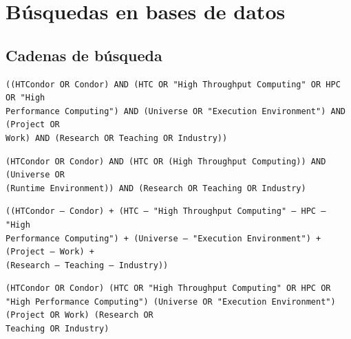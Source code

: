 \appendix


\chapter{Búsquedas en bases de datos}

\section{Cadenas de búsqueda}\label{sec:cadenas-busqueda}


\begin{tcolorbox}[
		colback=gray!5,
		colframe=black!60,
		title=Cadena de búsqueda en ACM Full Text Collection,
		fonttitle=\bfseries,
		sharp corners=south
	]
	\scriptsize
	\begin{verbatim}
((HTCondor OR Condor) AND (HTC OR "High Throughput Computing" OR HPC OR "High 
Performance Computing") AND (Universe OR "Execution Environment") AND (Project OR 
Work) AND (Research OR Teaching OR Industry))
	\end{verbatim}
\end{tcolorbox}

\begin{tcolorbox}[
		colback=gray!5,
		colframe=black!60,
		title=Cadena de búsqueda en IEEE Xplore,
		fonttitle=\bfseries,
		sharp corners=south
	]
	\scriptsize
	\begin{verbatim}
(HTCondor OR Condor) AND (HTC OR (High Throughput Computing)) AND (Universe OR 
(Runtime Environment)) AND (Research OR Teaching OR Industry)
	\end{verbatim}
\end{tcolorbox}

\begin{tcolorbox}[
		colback=gray!5,
		colframe=black!60,
		title=Cadena de búsqueda en Springer,
		fonttitle=\bfseries,
		sharp corners=south
	]
	\scriptsize
	\begin{verbatim}
((HTCondor — Condor) + (HTC — "High Throughput Computing" — HPC — "High 
Performance Computing") + (Universe — "Execution Environment") + (Project — Work) + 
(Research — Teaching — Industry))
	\end{verbatim}
\end{tcolorbox}

\begin{tcolorbox}[
		colback=gray!5,
		colframe=black!60,
		title=Cadena de búsqueda en ScienceDirect,
		fonttitle=\bfseries,
		sharp corners=south
	]
	\scriptsize
	\begin{verbatim}
(HTCondor OR Condor) (HTC OR "High Throughput Computing" OR HPC OR "High Performance Computing") (Universe OR "Execution Environment") (Project OR Work) (Research OR 
Teaching OR Industry)
	\end{verbatim}
\end{tcolorbox}

